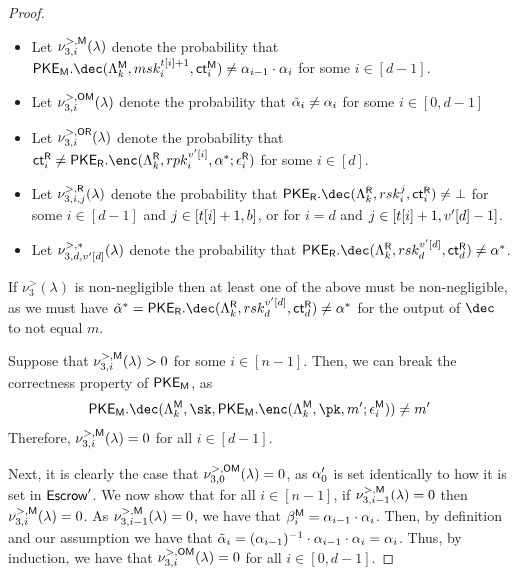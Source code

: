 \begin{proof}
	\newcommand{\badprobmat}[1]{\ensuremath{\nu_{3, #1}^{>,\mat}(\secpar)}}
	\newcommand{\badprobotpM}[1]{\ensuremath{\nu_{3, #1}^{>, \mathsf{OM}}(\secpar)}}
	\newcommand{\badprobotpR}[1]{\ensuremath{\nu_{3, #1}^{>, \mathsf{OR}}(\secpar)}}
	\newcommand{\badprobrev}[2]{\ensuremath{\nu_{3, #1, #2}^{>, \mathsf{\rev}}(\secpar)}}
	\newcommand{\badprobrevF}{\ensuremath{\nu_{3, d, \uval'[d]}^{>, \mathsf{*}}(\secpar)}}
	\begin{itemize}
		\item Let \badprobmat{i} denote the probability that $\pkem.\dec(\pkempp, \matsk_i^{\thr[i] + 1}, \mct_i) \allowbreak\neq\allowbreak \otpk_{i - 1} \cdot \otpk_i$ for some $i \in [d - 1]$.
		\item Let \badprobotpM{i} denote the probability that $\tilde{\alpha}_i \neq \alpha_i$ for some $i \in [0, d - 1]$
		\item Let \badprobotpR{i} denote the probability that $\revct_i \neq \pker.\enc(\pkerpp, \revpk_i^{\uval'[i]}, \otpk^*; \rer_i)$ for some $i \in [d]$.
		\item Let \badprobrev{i}{j} denote the probability that $\pker.\dec(\pkerpp, \revsk_i^j, \revct_i) \neq \bot$ for some $i \in [d - 1]$ and $j \in [t[i] + 1, b]$, or for $i = d$ and $j \in [t[i] + 1, v'[d] - 1]$.
		\item Let \badprobrevF{} denote the probability that $\pker.\dec(\pkerpp, \revsk_d^{\uval'[d]}, \revct_d) \neq \otpk^*$.
	\end{itemize}

	If $\nu_3^{>}(\lambda)$ is non-negligible then at least one of the above must be non-negligible, as we must have $\tilde{\otpk}^* = \pker.\dec(\pkerpp, \revsk_d^{\uval'[d]}, \revct_d) \neq \otpk^*$ for the output of $\dec$ to not equal $m$.

	Suppose that $\badprobmat{i} > 0$ for some $i \in [n - 1]$.
	Then, we can break the correctness property of ${{\mathsf{PKE}_{{\mathsf{M}}}}}$, as
	$$
		\pkem.\dec(\pkempp, \sk, \pkem.\enc(\pkempp, \pk, \msg'; \mer_i)) \neq \msg'
	$$
	Therefore, $\badprobmat{i} = 0$ for all $i \in [d - 1]$.

	Next, it is clearly the case that $\badprobotpM{0} = 0$, as $\alpha_0'$ is set identically to how it is set in ${\sf Escrow}'$.
	We now show that for all $i \in [n - 1]$, if $\badprobmat{i - 1} = 0$ then $\badprobmat{i} = 0$.
	As $\badprobmat{i - 1} = 0$, we have that $\beta_i^{{{\mathsf{M}}}} = \alpha_{i - 1}\cdot \alpha_i$.
	Then, by definition and our assumption we have that $\tilde{\alpha}_i = (\alpha_{i - 1})^{-1}\cdot \alpha_{i - 1}\cdot \alpha_i = \alpha_i$.
	Thus, by induction, we have that $\badprobotpM{i} = 0$ for all $i \in [0, d - 1]$.


\end{proof}
